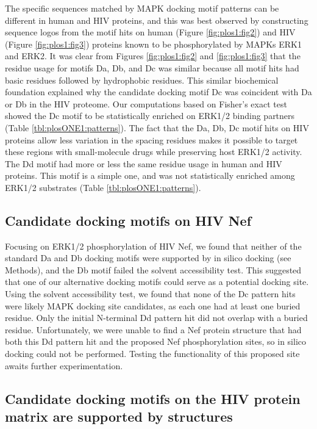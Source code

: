 The specific sequences matched by MAPK docking motif patterns can be
different in human and HIV proteins, and this was best observed by
constructing sequence logos from the motif hits on human (Figure
\ref{fig:plos1:fig2}) and HIV (Figure \ref{fig:plos1:fig3}) proteins
known to be phosphorylated by MAPKs ERK1 and ERK2. It was clear from
Figures \ref{fig:plos1:fig2} and ​\ref{fig:plos1:fig3} that the residue
usage for motifs Da, Db, and Dc was similar because all motif hits had
basic residues followed by hydrophobic residues. This similar
biochemical foundation explained why the candidate docking motif Dc
was coincident with Da or Db in the HIV proteome. Our computations
based on Fisher's exact test showed the Dc motif to be statistically
enriched on ERK1/2 binding partners (Table
\ref{tbl:plosONE1:patterns}). The fact that the Da, Db, Dc motif hits
on HIV proteins allow less variation in the spacing residues makes it
possible to target these regions with small-molecule drugs while
preserving host ERK1/2 activity. The Dd motif had more or less the
same residue usage in human and HIV proteins. This motif is a simple
one, and was not statistically enriched among ERK1/2 substrates (Table
\ref{tbl:plosONE1:patterns}).

\subsection{Candidate docking motifs on HIV Nef}

Focusing on ERK1/2 phosphorylation of HIV Nef, we found that neither
of the standard Da and Db docking motifs were supported by in silico
docking (see Methods), and the Db motif failed the solvent
accessibility test. This suggested that one of our alternative docking
motifs could serve as a potential docking site. Using the solvent
accessibility test, we found that none of the Dc pattern hits were
likely MAPK docking site candidates, as each one had at least one
buried residue. Only the initial N-terminal Dd pattern hit did not
overlap with a buried residue. Unfortunately, we were unable to find a
Nef protein structure that had both this Dd pattern hit and the
proposed Nef phosphorylation sites, so in silico docking could not be
performed. Testing the functionality of this proposed site awaits
further experimentation.

\subsection{Candidate docking motifs on the HIV protein matrix are supported by structures}

